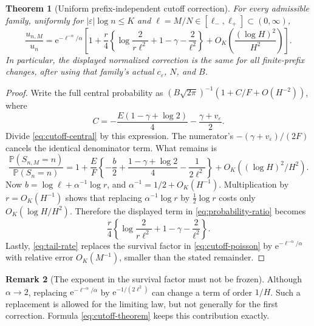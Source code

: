 \documentclass[11pt,a4paper]{article}
\numberwithin{equation}{section}
\newtheorem{theorem}{Theorem}[section]
\theoremstyle{definition}
\newtheorem{remark}[theorem]{Remark}
\theoremstyle{remark}
\newcommand{\eps}{\varepsilon}
\newcommand{\Pp}{\mathbb P}
\newcommand{\ee}{\mathrm e}
\begin{document}
\begin{theorem}[Uniform prefix-independent cutoff correction]
\label{thm:cutoff}
For every admissible family, uniformly for \(|\eps|\log n\le K\) and
\(\ell=M/N\in[\ell_-,\ell_+]\subset(0,\infty)\),
\begin{equation}
 \frac{u_{n,M}}{u_n}
 =\ee^{-\ell^{-\alpha}/\alpha}
 \left[
 1+\frac r4\left\{\log\frac{2}{r\ell^2}+1-\gamma-\frac2{\ell^2}\right\}
 +O_K\left(\frac{(\log H)^2}{H^2}\right)
 \right].
 \label{eq:cutoff-theorem}
\end{equation}
In particular, the displayed normalized correction is the same for all
finite-prefix changes, after using that family's actual \(c_{\eps}\),
\(N\), and \(B\).
\end{theorem}
\begin{proof}
Write the full central probability as
\((B\sqrt{2\pi})^{-1}(1+C/F+O(H^{-2}))\), where
\[
 C=-\frac{E(1-\gamma+\log2)}4-\frac{\gamma+v_{\eps}}2.
\]
Divide \eqref{eq:cutoff-central} by this expression. The numerator's
\(-(\gamma+v_{\eps})/(2F)\) cancels the identical denominator term.
What remains is
\begin{equation}
 \frac{\Pp(S_{n,M}=n)}{\Pp(S_n=n)}
 =1+\frac EF\left\{-\frac b2
        +\frac{1-\gamma+\log2}{4}-\frac1{2\ell^2}\right\}
   +O_K((\log H)^2/H^2).
 \label{eq:probability-ratio}
\end{equation}
Now \(b=\log\ell+\alpha^{-1}\log r\), and
\(\alpha^{-1}=1/2+O_K(H^{-1})\). Multiplication by \(r=O_K(H^{-1})\)
shows that replacing \(\alpha^{-1}\log r\) by \(\tfrac12\log r\)
costs only \(O_K(\log H/H^2)\). Therefore the displayed term in
\eqref{eq:probability-ratio} becomes
\[
 \frac r4\left\{\log\frac{2}{r\ell^2}+1-\gamma-\frac2{\ell^2}\right\}.
\]
Lastly, \eqref{eq:tail-rate} replaces the survival factor in
\eqref{eq:cutoff-poisson} by \(\ee^{-\ell^{-\alpha}/\alpha}\) with relative
error \(O_K(M^{-1})\), smaller than the stated remainder.
\end{proof}

\begin{remark}[The exponent in the survival factor must not be frozen]
Although \(\alpha\to2\), replacing
\(\ee^{-\ell^{-\alpha}/\alpha}\) by \(\ee^{-1/(2\ell^2)}\) can change a
term of order \(1/H\). Such a replacement is allowed for the limiting
law, but not generally for the first correction. Formula
\eqref{eq:cutoff-theorem} keeps this contribution exactly.
\end{remark}
\end{document}
